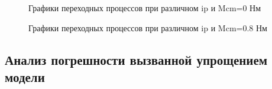 \documentclass[a4paper, 12pt]{article}
\begin{document}
\begin{figure}[h]
	\begin{minipage}[h]{0.55\linewidth}
	\end{minipage}
	\hfill
	\begin{minipage}[h]{0.55\linewidth}
	\end{minipage}
	\vfill
	\begin{minipage}[h]{0.55\linewidth}
		\centering{\texttt{[image: w4]} \\ $\omega$}
	\end{minipage}
	\hfill
	\begin{minipage}[h]{0.55\linewidth}
	\end{minipage}
	\caption{Графики переходных процессов при различном ip и Mcm=0 Нм}
\end{figure}
\newpage
\begin{figure}[h]
	\begin{minipage}[h]{0.55\linewidth}
	\end{minipage}
	\hfill
	\begin{minipage}[h]{0.55\linewidth}
	\end{minipage}
	\vfill
	\begin{minipage}[h]{0.55\linewidth}
		\centering{\texttt{[image: w5]} \\ $\omega$}
	\end{minipage}
	\hfill
	\begin{minipage}[h]{0.55\linewidth}
	\end{minipage}
	\caption{Графики переходных процессов при различном ip и Mcm=0.8 Нм}
\end{figure}
\newpage
\begin{center}
	\section{Анализ погрешности вызванной упрощением модели}
\end{center}\par
\end{document}
